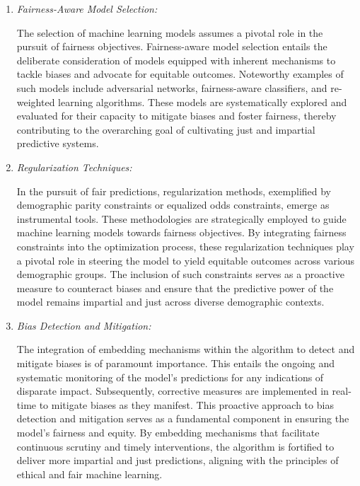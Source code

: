 \begin{enumerate}

    \item \emph{Fairness-Aware Model Selection:} 
    
    The selection of machine learning models assumes a pivotal role in the pursuit of fairness objectives. Fairness-aware model selection entails the deliberate consideration of models equipped with inherent mechanisms to tackle biases and advocate for equitable outcomes. Noteworthy examples of such models include adversarial networks, fairness-aware classifiers, and re-weighted learning algorithms. These models are systematically explored and evaluated for their capacity to mitigate biases and foster fairness, thereby contributing to the overarching goal of cultivating just and impartial predictive systems.
    
    \item \emph{Regularization Techniques:} 
    
    In the pursuit of fair predictions, regularization methods, exemplified by demographic parity constraints or equalized odds constraints, emerge as instrumental tools. These methodologies are strategically employed to guide machine learning models towards fairness objectives. By integrating fairness constraints into the optimization process, these regularization techniques play a pivotal role in steering the model to yield equitable outcomes across various demographic groups. The inclusion of such constraints serves as a proactive measure to counteract biases and ensure that the predictive power of the model remains impartial and just across diverse demographic contexts.

    \item \emph{Bias Detection and Mitigation:} 
    
    The integration of embedding mechanisms within the algorithm to detect and mitigate biases is of paramount importance. This entails the ongoing and systematic monitoring of the model's predictions for any indications of disparate impact. Subsequently, corrective measures are implemented in real-time to mitigate biases as they manifest. This proactive approach to bias detection and mitigation serves as a fundamental component in ensuring the model's fairness and equity. By embedding mechanisms that facilitate continuous scrutiny and timely interventions, the algorithm is fortified to deliver more impartial and just predictions, aligning with the principles of ethical and fair machine learning.


\end{enumerate}
